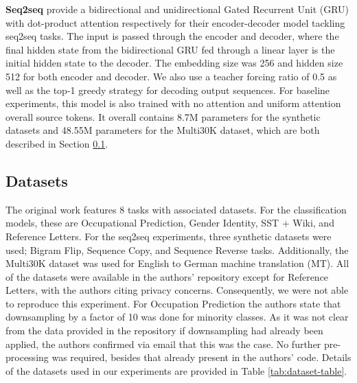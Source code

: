 \textbf{Seq2seq} \cite{pruthi-etal-2020-learning} provide a bidirectional and unidirectional Gated Recurrent Unit (GRU) with dot-product attention respectively for their encoder-decoder model tackling seq2seq tasks. The input is passed through the encoder and decoder, where the final hidden state from the bidirectional GRU fed through a linear layer is the initial hidden state to the decoder. The embedding size was 256 and hidden size 512 for both encoder and decoder. We also use a teacher forcing ratio of 0.5 as well as the top-1 greedy strategy for decoding output sequences. For baseline experiments, this model is also trained with no attention and uniform attention overall source tokens. It overall contains 8.7M parameters for the synthetic datasets and 48.55M parameters for the Multi30K dataset, which are both described in Section \ref{sec:datasets}.

\subsection{Datasets}
\label{sec:datasets}

The original work features 8 tasks with associated datasets. For the classification models, these are Occupational Prediction, Gender Identity, SST + Wiki, and Reference Letters. For the seq2seq experiments, three synthetic datasets were used; Bigram Flip, Sequence Copy, and Sequence Reverse tasks. Additionally, the Multi30K dataset \citep{elliott2016multi30k} was used for English to German machine translation (MT). All of the datasets were available in the authors' repository except for Reference Letters, with the authors citing privacy concerns. Consequently, we were not able to reproduce this experiment. For Occupation Prediction the authors state that downsampling by a factor of 10 was done for minority classes. As it was not clear from the data provided in the repository if downsampling had already been applied, the authors confirmed via email that this was the case. No further pre-processing was required, besides that already present in the authors' code. Details of the datasets used in our experiments are provided in Table \ref{tab:dataset-table}.

